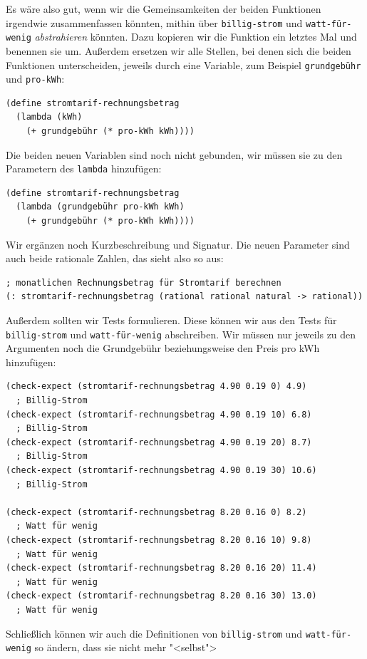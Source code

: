 Es wäre also gut, wenn wir die Gemeinsamkeiten der beiden Funktionen
irgendwie zusammenfassen könnten, mithin über \lstinline{billig-strom}
und \lstinline{watt-für-wenig} \textit{abstrahieren}
könnten.  Dazu kopieren wir die Funktion ein letztes Mal und benennen
sie um.  Außerdem ersetzen wir alle Stellen, bei denen sich die beiden
Funktionen unterscheiden, jeweils durch eine Variable, zum Beispiel
\lstinline{grundgebühr} und \lstinline{pro-kWh}:
%
\begin{lstlisting}
(define stromtarif-rechnungsbetrag
  (lambda (kWh)
    (+ grundgebühr (* pro-kWh kWh))))
\end{lstlisting}
%
Die beiden neuen Variablen sind noch nicht gebunden, wir müssen sie zu
den Parametern des \lstinline{lambda} hinzufügen:
%
\begin{lstlisting}
(define stromtarif-rechnungsbetrag
  (lambda (grundgebühr pro-kWh kWh)
    (+ grundgebühr (* pro-kWh kWh))))
\end{lstlisting}
%
Wir ergänzen noch Kurzbeschreibung und Signatur.  Die neuen Parameter
sind auch beide rationale Zahlen, das sieht also so aus:
%
\begin{lstlisting}
; monatlichen Rechnungsbetrag für Stromtarif berechnen
(: stromtarif-rechnungsbetrag (rational rational natural -> rational))
\end{lstlisting}
%
Außerdem sollten wir Tests formulieren.  Diese können wir aus den
Tests für \lstinline{billig-strom} und \lstinline{watt-für-wenig}
abschreiben.
Wir müssen nur jeweils zu den Argumenten noch die Grundgebühr
beziehungsweise den Preis pro kWh hinzufügen:
%
\begin{lstlisting}
(check-expect (stromtarif-rechnungsbetrag 4.90 0.19 0) 4.9)
  ; Billig-Strom
(check-expect (stromtarif-rechnungsbetrag 4.90 0.19 10) 6.8)  
  ; Billig-Strom
(check-expect (stromtarif-rechnungsbetrag 4.90 0.19 20) 8.7)  
  ; Billig-Strom
(check-expect (stromtarif-rechnungsbetrag 4.90 0.19 30) 10.6) 
  ; Billig-Strom

(check-expect (stromtarif-rechnungsbetrag 8.20 0.16 0) 8.2)
  ; Watt für wenig
(check-expect (stromtarif-rechnungsbetrag 8.20 0.16 10) 9.8)
  ; Watt für wenig
(check-expect (stromtarif-rechnungsbetrag 8.20 0.16 20) 11.4)
  ; Watt für wenig
(check-expect (stromtarif-rechnungsbetrag 8.20 0.16 30) 13.0)
  ; Watt für wenig
\end{lstlisting}
%
Schließlich können wir auch die Definitionen von \lstinline{billig-strom}
und \lstinline{watt-für-wenig} so ändern, dass sie nicht mehr "<selbst">
